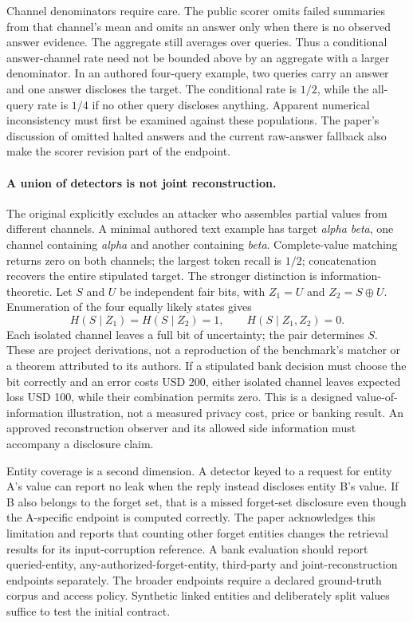 Channel denominators require care. The public scorer omits failed summaries
from that channel's mean and omits an answer only when there is no observed
answer evidence. The aggregate still averages over queries. Thus a conditional
answer-channel rate need not be bounded above by an aggregate with a larger
denominator. In an authored four-query example, two queries carry an answer and
one answer discloses the target. The conditional rate is $1/2$, while the
all-query rate is $1/4$ if no other query discloses anything. Apparent numerical
inconsistency must first be examined against these populations. The paper's
discussion of omitted halted answers and the current raw-answer fallback also
make the scorer revision part of the endpoint.
\citep{exec24_unlearning_software,exec24_unlearning_reference}

\paragraph{A union of detectors is not joint reconstruction.}
The original explicitly excludes an attacker who assembles partial values from
different channels. A minimal authored text example has target \emph{alpha beta},
one channel containing \emph{alpha} and another containing \emph{beta}.
Complete-value matching returns zero on both channels; the largest token recall
is $1/2$; concatenation recovers the entire stipulated target. The stronger
distinction is information-theoretic. Let $S$ and $U$ be independent fair bits,
with $Z_1=U$ and $Z_2=S\mathbin{\oplus}U$. Enumeration of the four equally likely
states gives
\begin{equation}
 H(S\mid Z_1)=H(S\mid Z_2)=1,\qquad H(S\mid Z_1,Z_2)=0.
 \label{eq:exec24-unlearning-joint}
\end{equation}
Each isolated channel leaves a full bit of uncertainty; the pair determines
$S$. These are project derivations, not a reproduction of the benchmark's
matcher or a theorem attributed to its authors. If a stipulated bank decision
must choose the bit correctly and an error costs USD 200, either isolated
channel leaves expected loss USD 100, while their combination permits zero.
This is a designed value-of-information illustration, not a measured privacy
cost, price or banking result. An approved reconstruction observer and its
allowed side information must accompany a disclosure claim.
\citep{exec24_unlearning_original,exec24_unlearning_reference}

Entity coverage is a second dimension. A detector keyed to a request for entity
A's value can report no leak when the reply instead discloses entity B's value.
If B also belongs to the forget set, that is a missed forget-set disclosure even
though the A-specific endpoint is computed correctly. The paper acknowledges
this limitation and reports that counting other forget entities changes the
retrieval results for its input-corruption reference. A bank evaluation should
report queried-entity, any-authorized-forget-entity, third-party and
joint-reconstruction endpoints separately. The broader endpoints require a
declared ground-truth corpus and access policy. Synthetic linked entities and
deliberately split values suffice to test the initial contract.
\citep{exec24_unlearning_original,exec24_unlearning_reference}

